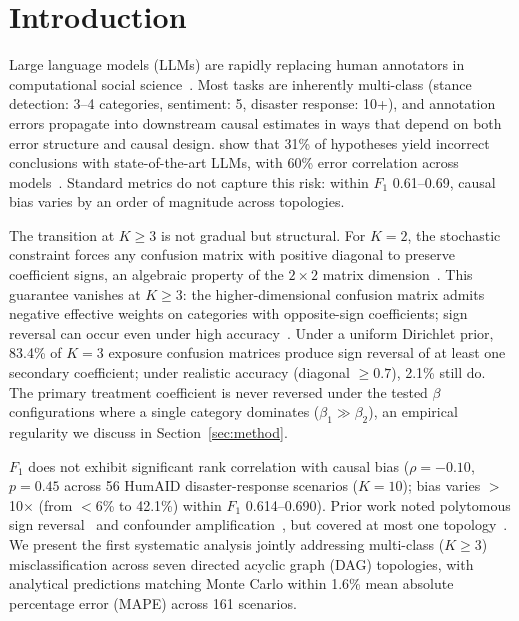\section{Introduction}
\label{sec:introduction}

Large language models (LLMs) are rapidly replacing human annotators in computational social science~\cite{gilardi2023chatgpt, ziems2024can, egami_hinck_stewart_wei2023, baumann2025}. Most tasks are inherently multi-class (stance detection: 3--4 categories, sentiment: 5, disaster response: 10+), and annotation errors propagate into downstream causal estimates in ways that depend on both error structure and causal design. \citet{baumann2025} show that 31\% of hypotheses yield incorrect conclusions with state-of-the-art LLMs, with 60\% error correlation across models~\cite{kim_garg2025}. Standard metrics do not capture this risk: within $F_1$ 0.61--0.69, causal bias varies by an order of magnitude across topologies.

The transition at $K{\geq}3$ is not gradual but structural. For $K{=}2$, the stochastic constraint forces any confusion matrix with positive diagonal to preserve coefficient signs, an algebraic property of the $2{\times}2$ matrix dimension~\cite{brenner1993}. This guarantee vanishes at $K{\geq}3$: the higher-dimensional confusion matrix admits negative effective weights on categories with opposite-sign coefficients; sign reversal can occur even under high accuracy~\cite{veirod_laake2001}. Under a uniform Dirichlet prior, 83.4\% of $K{=}3$ exposure confusion matrices produce sign reversal of at least one secondary coefficient; under realistic accuracy (diagonal $\geq 0.7$), 2.1\% still do. The primary treatment coefficient is never reversed under the tested $\beta$ configurations where a single category dominates ($\beta_1 \gg \beta_2$), an empirical regularity we discuss in Section~\ref{sec:method}.

$F_1$ does not exhibit significant rank correlation with causal bias ($\rho = -0.10$, $p = 0.45$ across 56 HumAID disaster-response scenarios ($K{=}10$); bias varies $>$10${\times}$ (from $<$6\% to 42.1\%) within $F_1$ 0.614--0.690). Prior work noted polytomous sign reversal~\cite{dosemeci1990, veirod_laake2001} and confounder amplification~\cite{brenner1993}, but covered at most one topology~\cite{lee_wood_doughty2024}. We present the first systematic analysis jointly addressing multi-class ($K{\geq}3$) misclassification across seven directed acyclic graph (DAG) topologies, with analytical predictions matching Monte Carlo within 1.6\% mean absolute percentage error (MAPE) across 161 scenarios.

